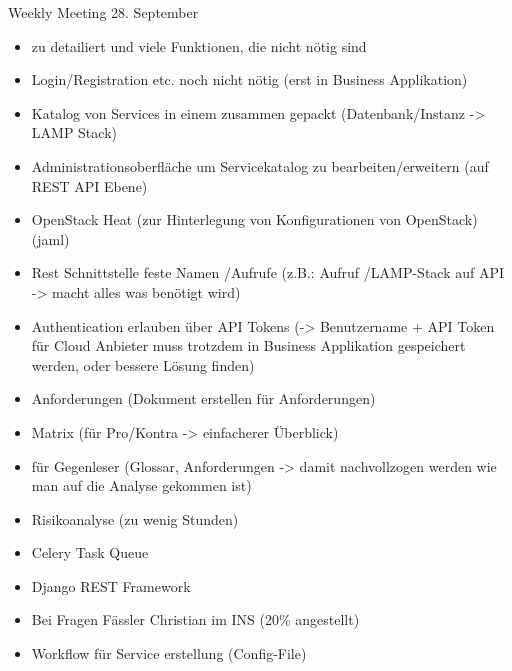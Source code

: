 \begin{Protokoll}{Weekly Meeting 28. September}
\protokollKopf

\begin{itemize}
  \item zu detailiert und viele Funktionen, die nicht nötig sind
  \item Login/Registration etc. noch nicht nötig (erst in Business Applikation)
\end{itemize}

\begin{itemize}
  \item Katalog von Services in einem zusammen gepackt (Datenbank/Instanz -> LAMP Stack)
  \item Administrationsoberfläche um Servicekatalog zu bearbeiten/erweitern (auf REST API Ebene)
  \item OpenStack Heat (zur Hinterlegung von Konfigurationen von OpenStack) (jaml)
  \item Rest Schnittstelle feste Namen /Aufrufe (z.B.: Aufruf /LAMP-Stack auf API -> macht alles was benötigt wird)
  \item Authentication erlauben über API Tokens (-> Benutzername + API Token für Cloud Anbieter 
  muss trotzdem in Business Applikation gespeichert werden, oder bessere Lösung finden)
\end{itemize}

\begin{itemize}
  \item Anforderungen (Dokument erstellen für Anforderungen)
  \item Matrix (für Pro/Kontra -> einfacherer Überblick)
  \item für Gegenleser (Glossar, Anforderungen -> damit nachvollzogen werden wie 
  man auf die Analyse gekommen ist)
  \item Risikoanalyse (zu wenig Stunden)
\end{itemize}

\begin{itemize}
  \item Celery Task Queue
  \item Django REST Framework
  \item Bei Fragen Fässler Christian im INS (20\% angestellt)
  \item Workflow für Service erstellung (Config-File)
\end{itemize}


\end{Protokoll}
